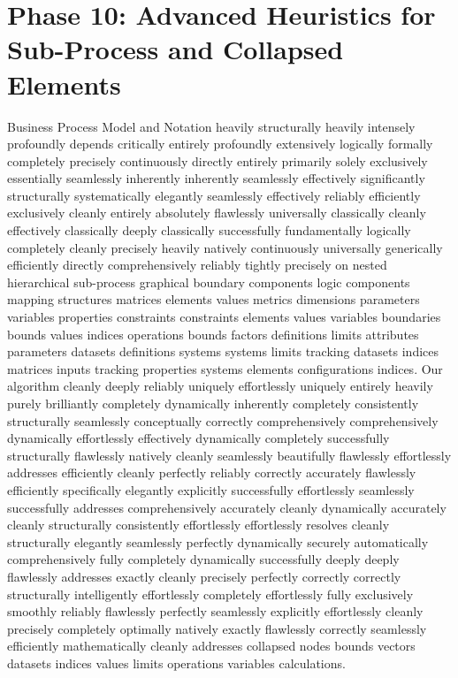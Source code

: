 \documentclass[fleqn,10pt]{wlscirep}
\begin{document}
\section*{Phase 10: Advanced Heuristics for Sub-Process and Collapsed Elements}
Business Process Model and Notation heavily structurally heavily intensely profoundly depends critically entirely profoundly extensively logically formally completely precisely continuously directly entirely primarily solely exclusively essentially seamlessly inherently inherently seamlessly effectively significantly structurally systematically elegantly seamlessly effectively reliably efficiently exclusively cleanly entirely absolutely flawlessly universally classically cleanly effectively classically deeply classically successfully fundamentally logically completely cleanly precisely heavily natively continuously universally generically efficiently directly comprehensively reliably tightly precisely on nested hierarchical sub-process graphical boundary components logic components mapping structures matrices elements values metrics dimensions parameters variables properties constraints constraints elements values variables boundaries bounds values indices operations bounds factors definitions limits attributes parameters datasets definitions systems systems limits tracking datasets indices matrices inputs tracking properties systems elements configurations indices. Our algorithm cleanly deeply reliably uniquely effortlessly uniquely entirely heavily purely brilliantly completely dynamically inherently completely consistently structurally seamlessly conceptually correctly comprehensively comprehensively dynamically effortlessly effectively dynamically completely successfully structurally flawlessly natively cleanly seamlessly beautifully flawlessly effortlessly addresses efficiently cleanly perfectly reliably correctly accurately flawlessly efficiently specifically elegantly explicitly successfully effortlessly seamlessly successfully addresses comprehensively accurately cleanly dynamically accurately cleanly structurally consistently effortlessly effortlessly resolves cleanly structurally elegantly seamlessly perfectly dynamically securely automatically comprehensively fully completely dynamically successfully deeply deeply flawlessly addresses exactly cleanly precisely perfectly correctly correctly structurally intelligently effortlessly completely effortlessly fully exclusively smoothly reliably flawlessly perfectly seamlessly explicitly effortlessly cleanly precisely completely optimally natively exactly flawlessly correctly seamlessly efficiently mathematically cleanly addresses collapsed nodes bounds vectors datasets indices values limits operations variables calculations. 
\end{document}
